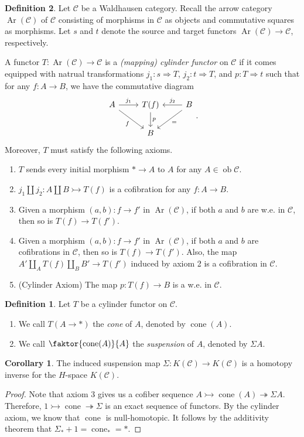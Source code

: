 \documentclass[10pt,letterpaper,cm]{nupset}
\theoremstyle{definition}
\newtheorem{definition}{Definition}
\theoremstyle{theorem}
\newtheorem{corollary}[theorem]{Corollary}
\theoremstyle{remark}
\newcommand{\1}{\mathbf{1}}
\renewcommand{\c}{\mathscr{C}}
\newcommand{\0}{\vec 0}
\DeclareMathOperator{\ob}{ob}
\DeclareMathOperator{\Ar}{Ar}
\DeclareMathOperator{\cone}{cone}
\begin{document}
\begin{definition}
Let $\c$ be a Waldhausen category. Recall the arrow category $\Ar(\c)$ of $\c$ consisting of morphisms in $\c$ as objects and commutative squares as morphisms. Let $s$ and $t$ denote the source and target functors $\Ar(\c)\to \c$, respectively. 

A functor $T: \Ar(\c) \to \c$ is a \textit{(mapping) cylinder functor} on $\c$ if it comes equipped with natrual transformations $j_1 :  s \Rightarrow T$, $j_2 : t \Rightarrow T$, and $p: T \Rightarrow t$ such that for any $f: A \to B$, we have the commutative diagram
\[
\begin{tikzcd}
A \arrow[r, "j_1"] \arrow[rd, "f"'] & T(f) \arrow[d, "p"] & B \arrow[l, "j_2"'] \arrow[ld, "="] \\
 & B & 
\end{tikzcd}
. \]
Moreover, $T$ must satisfy the following axioms.
\begin{enumerate}
\item $T$ sends every initial morphism $\ast \to A$ to $A$ for any $A \in \ob \c$.
\item $j_1 \coprod j_2 : A \coprod B \rightarrowtail T(f)$ is a cofibration for any $f: A \to B$.
\item Given a morphism $(a,b) : f \to f'$ in $\Ar(\c)$, if both $a$ and $b$ are w.e. in $\c$, then so is $T(f) \to T(f').$
\item Given a morphism $(a,b) : f \to f'$ in $\Ar(\c)$, if both $a$ and $b$ are cofibrations in $\c$, then so is $T(f) \to T(f')$. Also, the map $A' \coprod_A T(f) \coprod_B B' \to T(f')$ induced by axiom 2 is a cofibration in $\c$.
\item {(Cylinder Axiom)} The map $p: T(f) \to B$ is a w.e. in $\c$.
\end{enumerate}
\begin{definition} Let $T$ be a cylinder functor on $\c$.
\begin{enumerate}
\item We call $T(A \to \ast)$ the \textit{cone} of $A$, denoted by $\cone(A)$.
\item We call $\faktor{\cone(A)}{A}$ the \textit{suspension} of $A$, denoted by $\Sigma A$. 
\end{enumerate}
\end{definition}
\begin{corollary}
The induced suspension map $\Sigma : K(\c) \to K(\c)$ is a homotopy inverse for the $H$-space $K(\c)$.
\end{corollary}
\begin{proof}
Note that axiom 3 gives us a cofiber sequence $A \rightarrowtail \cone(A) \twoheadrightarrow \Sigma A$. Therefore, $1 \rightarrowtail \cone \twoheadrightarrow \Sigma$ is an exact sequence of functors. By the cylinder axiom, we know that $\cone$ is null-homotopic. It follows by the additivity theorem that $\Sigma_{\ast} + 1 =  \cone_{\ast} = \ast$.
\end{proof}
\end{definition}
\end{document}
